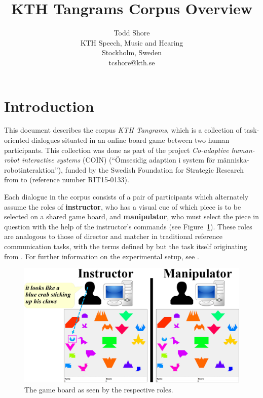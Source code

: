 \documentclass[USenglish]{article}
\newcommand{\term}[1]{{\bfseries #1}}	%
\newcommand{\corpusname}{KTH Tangrams}
\begin{document}
\title{\corpusname{} Corpus Overview}
\author{Todd Shore \\
KTH Speech, Music and Hearing \\
Stockholm, Sweden \\
{tcshore@kth.se}}	%
\date{}
\maketitle

\tableofcontents

\section{Introduction}

This document describes the corpus \emph{\corpusname{}}, which is a collection of task-oriented dialogues situated in an online board game between two human participants. This collection was done as part of the project \emph{Co-adaptive human-robot interactive systems} (COIN) (\enquote{\"Omsesidig adaption i system f\"or m\"anniska-robotinteraktion}), funded by the Swedish Foundation for Strategic Research from  to  (reference number {RIT15-0133}).

Each dialogue in the corpus consists of a pair of participants which alternately assume the roles of \term{instructor}, who has a visual cue of which piece is to be selected on a shared game board, and \term{manipulator}, who must select the piece in question with the help of the instructor's commands (see Figure~\ref{fig:experiment_setup}). These roles are analogous to those of director and matcher in traditional reference communication tasks, with the terms defined by \textcite{Schober&Clark:1989} but the task itself originating from \textcite{Krauss&Weinheimer:1964}. For further information on the experimental setup, see .

\begin{figure}[h]
	\begin{center}
		\includegraphics[width=\linewidth]{experiment-setup}
		\caption{The game board as seen by the respective roles.}
		\label{fig:experiment_setup}
	\end{center}
\end{figure}
\end{document}

